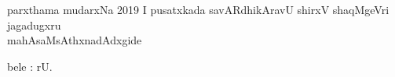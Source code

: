 \thispagestyle{empty}
\begin{center}
parxthama mudarxNa 2019
\vfill
I pusatxkada savARdhikAravU shirxV shaqMgeVri jagadugxru\\
mahAsaMsAthxnadAdxgide
\vfill

bele : rU.
\end{center}
